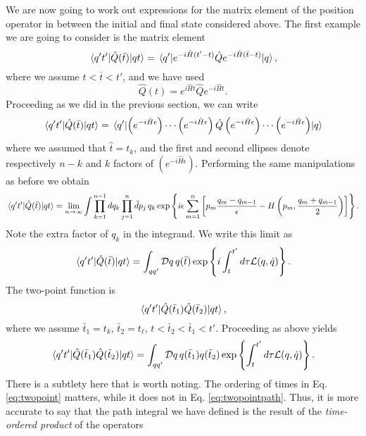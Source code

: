 \documentclass{article}
\numberwithin{equation}{section}
\begin{document}
We are now going to work out expressions for the matrix element of the position operator in between the initial and final state considered above. The first example we are going to consider is the matrix element
\begin{equation}
    \mel{q't'}{\hat{Q}(\bar{t})}{qt} = \mel{q'}{e^{-i\hat{H}(t'-t)}\hat{Q} e^{-i\hat{H}(\bar{t}-t)}}{q},
\end{equation}
where we assume $t < \bar{t} < t'$, and we have used
\begin{equation}
    \hat{Q}(t) = e^{i\hat{H}t} \hat{Q} e^{-i\hat{H}t}.
\end{equation}
Proceeding as we did in the previous section, we can write
\begin{equation}
    \mel{q't'}{\hat{Q}(\bar{t})}{qt} = \mel{q'}{\left(e^{-i\hat{H}\epsilon}\right) \cdots \left(e^{-i\hat{H}\epsilon}\right) \hat{Q} \left(e^{-i\hat{H}\epsilon}\right) \cdots \left(e^{-i\hat{H}\epsilon}\right)}{q}
\end{equation}
where we assumed that $\hat{t} = t_k$, and the first and second ellipses denote respectively $n-k$ and $k$ factors of $\left(e^{-i\hat{H}\epsilon}\right)$. Performing the same manipulations as before we obtain
\begin{equation}
    \mel{q't'}{\hat{Q}(\bar{t})}{qt} = \lim_{n\rightarrow \infty} \int \prod_{k=1}^{n-1} dq_k \prod_{j=1}^n \hat{d}p_j \, q_k \exp\left\{i\epsilon \sum_{m=1}^n \left[p_m \frac{q_m - q_{m-1}}{\epsilon} - H\left(p_m, \frac{q_m + q_{m-1}}{2}\right)\right]\right\}.
\end{equation}
Note the extra factor of $q_k$ in the integrand. We write this limit as 
\begin{equation}
    \mel{q't'}{\hat{Q}(\bar{t})}{qt} = \int_{qq'} \mathcal{D}q\, q(\bar{t}) \exp\left\{i \int_t^{t'} d\tau \mathcal{L}(q, \dot{q})\right\}.    
\end{equation}
The two-point function is 
\begin{equation} \label{eq:twopoint}
    \mel{q't'}{\hat{Q}(\bar{t}_1) \hat{Q}(\bar{t}_2)}{qt},
\end{equation}
where we assume $\bar{t}_1 = t_k$, $\bar{t}_2 = t_\ell$, $t < \bar{t}_2 <  \bar{t}_1 < t'$. Proceeding as above yields
\begin{equation} \label{eq:twopointpath}
    \mel{q't'}{\hat{Q}(\bar{t}_1) \hat{Q}(\bar{t}_2)}{qt} = \int_{qq'}\mathcal{D}q \, q(\bar{t}_1) q(\bar{t}_2) \exp\left\{\int_t^{t'} d\tau \mathcal{L}(q, \dot{q})\right\}.
\end{equation}
There is a subtlety here that is worth noting. The ordering of times in Eq. \ref{eq:twopoint} matters, while it does not in Eq. \ref{eq:twopointpath}. Thus, it is more accurate to say that the path integral we have defined is the result of the \textit{time-ordered product} of the operators
\end{document}
